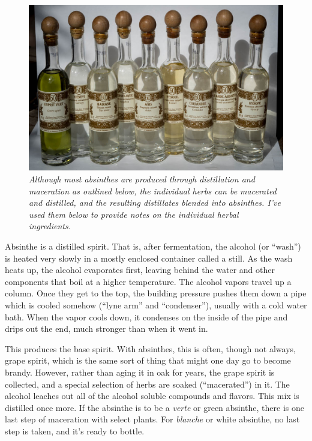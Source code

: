 \documentclass[12pt,letterpaper,oneside]{memoir}
\begin{document}
  \begin{figure}
    \includegraphics[width=\linewidth]{../../assets/tasting/naa-blends.jpg}
    \textit{Although most absinthes are produced through distillation and maceration as outlined below, the individual herbs can be macerated and distilled, and the resulting distillates blended into absinthes.  I've used them below to provide notes on the individual herbal ingredients.}
  \end{figure}

  Absinthe is a distilled spirit.  That is, after fermentation, the alcohol (or ``wash'') is heated very slowly in a mostly enclosed container called a still.  As the wash heats up, the alcohol evaporates first, leaving behind the water and other components that boil at a higher temperature.  The alcohol vapors travel up a column.  Once they get to the top, the building pressure pushes them down a pipe which is cooled somehow (``lyne arm'' and ``condenser''), usually with a cold water bath.  When the vapor cools down, it condenses on the inside of the pipe and drips out the end, much stronger than when it went in.

  This produces the base spirit.  With absinthes, this is often, though not always, grape spirit, which is the same sort of thing that might one day go to become brandy.  However, rather than aging it in oak for years, the grape spirit is collected, and a special selection of herbs are soaked (``macerated'') in it.  The alcohol leaches out all of the alcohol soluble compounds and flavors.  This mix is distilled once more.  If the absinthe is to be a \textit{verte} or green absinthe, there is one last step of maceration with select plants.  For \textit{blanche} or white absinthe, no last step is taken, and it's ready to bottle.
\end{document}
